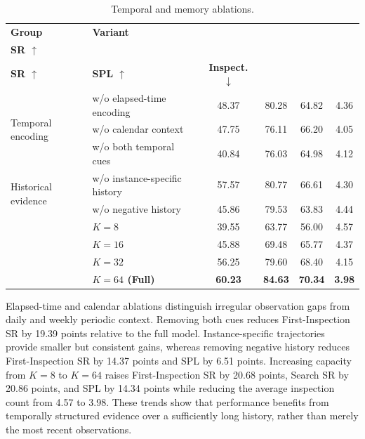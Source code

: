 \begin{table}[!htbp]
\caption{Temporal and memory ablations.}
\label{tab:temporal-memory-ablation}
\centering
\scriptsize
\setlength{\tabcolsep}{3.5pt}
\begin{tabularx}{0.88\linewidth}{@{}l>{\raggedright\arraybackslash}Xcccc@{}}
\toprule
\textbf{Group} & \textbf{Variant} &
\makecell{\textbf{First-Inspection}\\\textbf{SR $\uparrow$}} &
\makecell{\textbf{Search}\\\textbf{SR $\uparrow$}} & \textbf{SPL $\uparrow$} &
\textbf{Inspect. $\downarrow$}\\
\midrule
\multirow{3}{*}{Temporal encoding}
& w/o elapsed-time encoding & 48.37 & 80.28 & 64.82 & 4.36\\
& w/o calendar context & 47.75 & 76.11 & 66.20 & 4.05\\
& w/o both temporal cues & 40.84 & 76.03 & 64.98 & 4.12\\
\midrule
\multirow{2}{*}{Historical evidence}
& w/o instance-specific history & 57.57 & 80.77 & 66.61 & 4.30\\
& w/o negative history & 45.86 & 79.53 & 63.83 & 4.44\\
\midrule
& $K=8$ & 39.55 & 63.77 & 56.00 & 4.57\\
& $K=16$ & 45.88 & 69.48 & 65.77 & 4.37\\
& $K=32$ & 56.25 & 79.60 & 68.40 & 4.15\\
\rowcolor{tblours}\multirow{-4}{*}{History capacity} & \textbf{$K=64$ (Full)} & \textbf{60.23} &
\textbf{84.63} & \textbf{70.34} & \textbf{3.98}\\
\bottomrule
\end{tabularx}
\end{table}
\FloatBarrier

Elapsed-time and calendar ablations distinguish irregular observation gaps from
daily and weekly periodic context. Removing both cues reduces First-Inspection SR by
19.39 points relative to the full model. Instance-specific trajectories provide
smaller but consistent gains, whereas removing negative history reduces
First-Inspection SR by 14.37 points and SPL by 6.51 points. Increasing capacity from $K=8$ to $K=64$
raises First-Inspection SR by 20.68 points, Search SR by 20.86 points, and SPL by 14.34
points while reducing the average inspection count from 4.57 to 3.98. These
trends show that performance benefits from temporally structured evidence over a
sufficiently long history, rather than merely the most recent observations.

